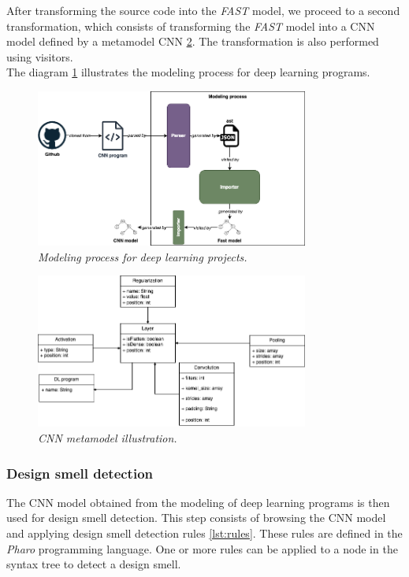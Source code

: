 After transforming the source code into the \emph{FAST} model, we proceed to a
second transformation, which consists of transforming the \emph{FAST} model into
a CNN model defined by a metamodel CNN \ref{fig:meta-model-cnn}. The transformation is also performed using visitors.\\

The diagram \ref{fig:modelling} illustrates the modeling process for deep learning programs.\\

\begin{figure}[h!]
  \centering
  \includegraphics[width=0.8\textwidth]{figure/design_smell_modeling.png}
  \caption{\emph{Modeling process for deep learning projects.}}
  \label{fig:modelling}
\end{figure}



\begin{figure}[h!]
  \centering
  \includegraphics[width=0.8\textwidth]{figure/meta-model-cnn.png}
  \caption{\emph{CNN metamodel illustration.}}
  \label{fig:meta-model-cnn}
\end{figure}


\subsubsection{Design smell detection}
\label{sec:designSmellDetection}
The CNN model obtained from the modeling of deep learning programs is then used
for design smell detection. This step consists of browsing the CNN model and
applying design smell detection rules \ref{lst:rules}. These rules are defined in the
\emph{Pharo} programming language. One or more rules can be applied to a node in
the syntax tree to detect a design smell.\\

